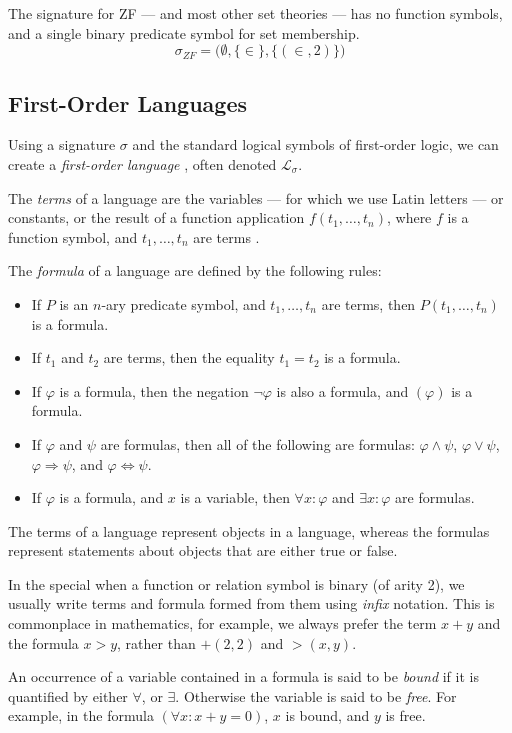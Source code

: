 \documentclass[11pt]{report}
\theoremstyle{definition}
\theoremstyle{theorem}
\theoremstyle{lemma}
\begin{document}
The signature for ZF --- and most other set theories --- has no function symbols, and a single binary predicate symbol for set membership.
$$\sigma_{\mathit{ZF}} = \big(\emptyset,\{\in\},\{(\in, 2)\})$$

\subsection{First-Order Languages}
Using a signature $\sigma$ and the standard logical symbols of first-order logic, we can create a \emph{first-order language} \cite[ch.~1]{stanmodel}, often denoted $\mathcal{L}_\sigma$.

The \emph{terms} of a language are the variables --- for which we use Latin letters --- or constants, or the result of a function application $f(t_1,\ldots, t_n)$, where $f$ is a function symbol, and $t_1,\ldots,t_n$ are terms \cite[ch.~1.3]{selinger}.

The \emph{formula} of a language are defined \cite[ch~1.4]{selinger} by the following rules:
\begin{itemize}
  \item If $P$ is an $n$-ary predicate symbol, and $t_1,\ldots,t_n$ are terms, then $P(t_1,\ldots,t_n)$ is a formula.
  \item If $t_1$ and $t_2$ are terms, then the equality $t_1 = t_2$ is a formula.
  \item If $\varphi$ is a formula, then the negation $\neg\varphi$ is also a formula, and $(\varphi)$ is a formula.
  \item If $\varphi$ and $\psi$ are formulas, then all of the following are formulas: $\varphi\wedge\psi$, $\varphi\vee\psi$, $\varphi\Rightarrow\psi$, and $\varphi\Leftrightarrow\psi$.
  \item If $\varphi$ is a formula, and $x$ is a variable, then $\forall x:\varphi$ and $\exists x:\varphi$ are formulas.
\end{itemize}
The terms of a language represent objects in a language, whereas the formulas represent statements about objects that are either true or false. 

In the special when a function or relation symbol is binary (of arity 2), we usually write terms and formula formed from them using \emph{infix} notation.
This is commonplace in mathematics, for example, we always prefer the term $x+y$ and the formula $x>y$, rather than $+(2,2)$ and $>(x,y)$.

An occurrence of a variable contained in a formula is said to be \emph{bound} if it is quantified by either $\forall$, or $\exists$.
Otherwise the variable is said to be \emph{free}. For example, in the formula $(\forall x: x+y=0)$, $x$ is bound, and $y$ is free.
\end{document}
